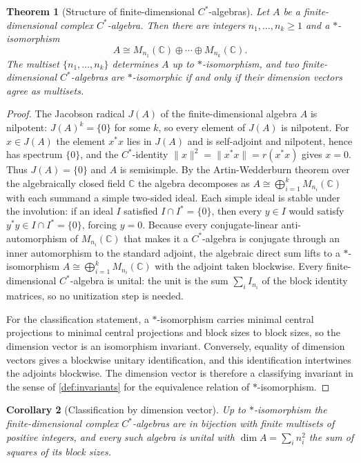 \documentclass[11pt,letterpaper]{article}
\newtheorem{theorem}{Theorem}[section]
\newtheorem{corollary}[theorem]{Corollary}
\theoremstyle{definition}
\theoremstyle{remark}
\begin{document}
\begin{theorem}[Structure of finite-dimensional $C^*$-algebras]
\label{thm:findim}
Let $A$ be a finite-dimensional complex $C^*$-algebra. Then there are integers $n_1, \dots, n_k \geq 1$ and a $*$-isomorphism
\[
A \cong M_{n_1}(\mathbb{C}) \oplus \cdots \oplus M_{n_k}(\mathbb{C}).
\]
The multiset $\{n_1, \dots, n_k\}$ determines $A$ up to $*$-isomorphism, and two finite-dimensional $C^*$-algebras are $*$-isomorphic if and only if their dimension vectors agree as multisets.
\end{theorem}

\begin{proof}
The Jacobson radical $J(A)$ of the finite-dimensional algebra $A$ is nilpotent: $J(A)^k = \{0\}$ for some $k$, so every element of $J(A)$ is nilpotent. For $x \in J(A)$ the element $x^* x$ lies in $J(A)$ and is self-adjoint and nilpotent, hence has spectrum $\{0\}$, and the $C^*$-identity $\|x\|^2 = \|x^* x\| = r(x^* x)$ gives $x = 0$. Thus $J(A) = \{0\}$ and $A$ is semisimple. By the Artin-Wedderburn theorem over the algebraically closed field $\mathbb{C}$ the algebra decomposes as $A \cong \bigoplus_{i=1}^{k} M_{n_i}(\mathbb{C})$ with each summand a simple two-sided ideal. Each simple ideal is stable under the involution: if an ideal $I$ satisfied $I \cap I^* = \{0\}$, then every $y \in I$ would satisfy $y^* y \in I \cap I^* = \{0\}$, forcing $y = 0$. Because every conjugate-linear anti-automorphism of $M_{n_i}(\mathbb{C})$ that makes it a $C^*$-algebra is conjugate through an inner automorphism to the standard adjoint, the algebraic direct sum lifts to a $*$-isomorphism $A \cong \bigoplus_{i=1}^{k} M_{n_i}(\mathbb{C})$ with the adjoint taken blockwise. Every finite-dimensional $C^*$-algebra is unital: the unit is the sum $\sum_i I_{n_i}$ of the block identity matrices, so no unitization step is needed.

For the classification statement, a $*$-isomorphism carries minimal central projections to minimal central projections and block sizes to block sizes, so the dimension vector is an isomorphism invariant. Conversely, equality of dimension vectors gives a blockwise unitary identification, and this identification intertwines the adjoints blockwise. The dimension vector is therefore a classifying invariant in the sense of \cref{def:invariants} for the equivalence relation of $*$-isomorphism.
\end{proof}

\begin{corollary}[Classification by dimension vector]
\label{cor:findimclass}
Up to $*$-isomorphism the finite-dimensional complex $C^*$-algebras are in bijection with finite multisets of positive integers, and every such algebra is unital with $\dim A = \sum_i n_i^2$ the sum of squares of its block sizes.
\end{corollary}
\end{document}
